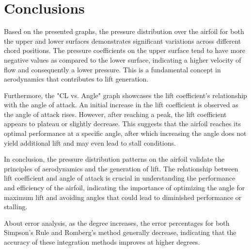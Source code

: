 \section{Conclusions}
\FloatBarrier %

Based on the presented graphs, the pressure distribution over the airfoil for both the upper and lower surfaces demonstrates significant variations across different chord positions. The pressure coefficients on the upper surface tend to have more negative values as compared to the lower surface, indicating a higher velocity of flow and consequently a lower pressure. This is a fundamental concept in aerodynamics that contributes to lift generation.

Furthermore, the "CL vs. Angle" graph showcases the lift coefficient's relationship with the angle of attack. An initial increase in the lift coefficient is observed as the angle of attack rises. However, after reaching a peak, the lift coefficient appears to plateau or slightly decrease. This suggests that the airfoil reaches its optimal performance at a specific angle, after which increasing the angle does not yield additional lift and may even lead to stall conditions.

In conclusion, the pressure distribution patterns on the airfoil validate the principles of aerodynamics and the generation of lift. The relationship between lift coefficient and angle of attack is crucial in understanding the performance and efficiency of the airfoil, indicating the importance of optimizing the angle for maximum lift and avoiding angles that could lead to diminished performance or stalling.

About error analysis, as the degree increases, the error percentages for both Simpson's Rule and Romberg's method generally decrease, indicating that the accuracy of these integration methods improves at higher degrees.